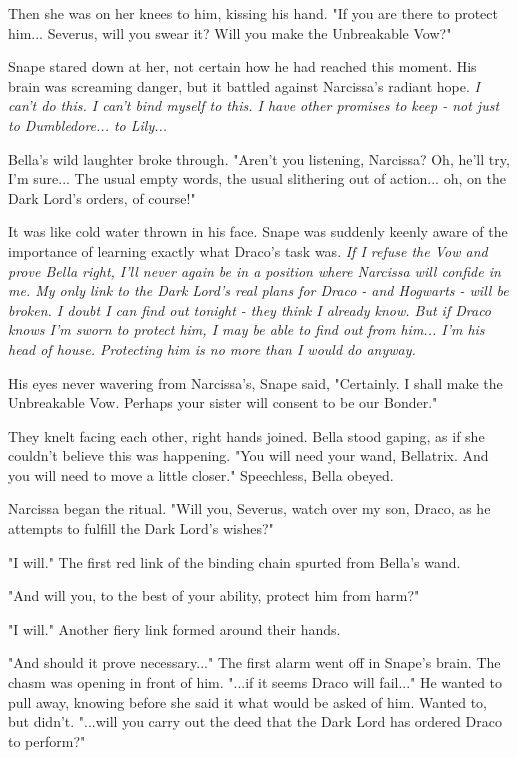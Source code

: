 \documentclass[a4paper,11pt]{article}
\begin{document}
Then she was on her knees to him, kissing his hand. "If you are there to protect him... Severus, will you swear it? Will you make the Unbreakable Vow?"

Snape stared down at her, not certain how he had reached this moment. His brain was screaming danger, but it battled against Narcissa's radiant hope. \emph{I can't do this. I can't bind myself to this. I have other promises to keep - not just to Dumbledore... to Lily...}

Bella's wild laughter broke through. "Aren't you listening, Narcissa? Oh, he'll try, I'm sure... The usual empty words, the usual slithering out of action... oh, on the Dark Lord's orders, of course!"

It was like cold water thrown in his face. Snape was suddenly keenly aware of the importance of learning exactly what Draco's task was. \emph{If I refuse the Vow and prove Bella right, I'll never again be in a position where Narcissa will confide in me. My only link to the Dark Lord's real plans for Draco - and Hogwarts - will be broken. I doubt I can find out tonight - they think I already know. But if Draco knows I'm sworn to protect him, I may be able to find out from him... I'm his head of house. Protecting him is no more than I would do anyway.}

His eyes never wavering from Narcissa's, Snape said, "Certainly. I shall make the Unbreakable Vow. Perhaps your sister will consent to be our Bonder."

They knelt facing each other, right hands joined. Bella stood gaping, as if she couldn't believe this was happening. "You will need your wand, Bellatrix. And you will need to move a little closer." Speechless, Bella obeyed.

Narcissa began the ritual. "Will you, Severus, watch over my son, Draco, as he attempts to fulfill the Dark Lord's wishes?"

"I will." The first red link of the binding chain spurted from Bella's wand.

"And will you, to the best of your ability, protect him from harm?"

"I will." Another fiery link formed around their hands.

"And should it prove necessary..." The first alarm went off in Snape's brain. The chasm was opening in front of him. "...if it seems Draco will fail..." He wanted to pull away, knowing before she said it what would be asked of him. Wanted to, but didn't. "...will you carry out the deed that the Dark Lord has ordered Draco to perform?"
\end{document}
